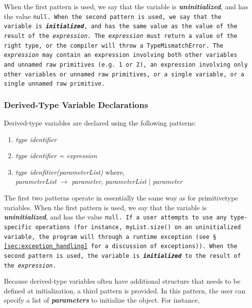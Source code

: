 \documentclass{article}
\begin{document}
When the first pattern is used, we say that the variable is
\textbf{\emph{uninitialized}}, and has the value \tt null\rm. When the second
pattern is used, we say that the variable is \textbf{\emph{initialized}}, and has
the same value as the value of the result of the \emph{expression}. The
\emph{expression} must return a value of the right type, or the compiler will
throw a \tt TypeMismatchError\rm. The \emph{expression} may contain an expression
involving both other variables and unnamed raw primitives (e.g. 1 or 2), an
expression involving only other variables or unnamed raw primitives, or a single
variable, or a single unnamed raw primitive.


\subsubsection{Derived-Type Variable Declarations} %
\label{ssub:derived_type_variable_declarations}

Derived-type variables are declared using the following patterns:

\begin{enumerate}
  \item \emph{type identifier}
  \item \emph{type identifier = expression }
  \item \emph{type idenfitier(parameterList)}  where, \\
  \indent \emph{parameterList} $\rightarrow$ \emph{parameter}, \emph{parameterList} $|$ \emph{parameter}
\end{enumerate}

The first two patterns operate in essentially the same way as for primitive­type
variables. When the first pattern is used, we say that the variable is
\textbf{\emph{uninitialized}}, and has the value \tt null\rm. If a user attempts
to use any type­specific operations (for instance, \tt myList.size() \rm on an
uninitialized variable, the program will through a run­time exception (see \S
\ref{sec:exception_handling} for a discussion of exceptions)). When the second
pattern is used, the variable is \textbf{\emph{initialized}} to the result of the
\emph{expression}.

Because derived-type variables often have additional structure that needs to be
defined at initialization, a third pattern is provided. In this pattern, the user
can specify a list of \textbf{\emph{parameters}} to initialize the object. For
instance,
\end{document}
